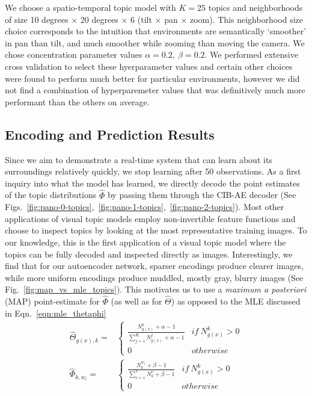 We choose a spatio-temporal topic model with $K = 25$ topics and neighborhoods of size 10 degrees $\times$ 20 degrees $\times$ 6 (tilt $\times$ pan $\times$ zoom). This neighborhood size choice corresponds to the intuition that environments are semantically `smoother' in pan than tilt, and much smoother while zooming than moving the camera. We chose concentration parameter values $\alpha = 0.2,~\beta = 0.2$. We performed extensive cross validation to select these hyerparameter values and certain other choices were found to perform much better for particular environments, however we did not find a combination of hyperparemeter values that was definitively much more performant than the others on average.

\subsection{Encoding and Prediction Results} \label{sec:spatial-prediction-results}
Since we aim to demonstrate a real-time system that can learn about its surroundings relatively quickly, we stop learning after 50 observations. As a first inquiry into what the model has learned, we directly decode the point estimates of the topic distributions $\hat{\Phi}$ by passing them through the CIB-AE decoder (See Figs.~\ref{fig:pano-0-topics},~\ref{fig:pano-1-topics},~\ref{fig:pano-2-topics}). Most other applications of visual topic models employ non-invertible feature functions and choose to inspect topics by looking at the most representative training images. To our knowledge, this is the first application of a visual topic model where the topics can be fully decoded and inspected directly as images. Interestingly, we find that for our autoencoder network, sparser encodings produce clearer images, while more uniform encodings produce muddled, mostly gray, blurry images (See Fig.~\ref{fig:map_vs_mle_topics}). This motivates us to use a \emph{maximum a posteriori} (MAP) point-estimate for $\hat{\Phi}$ (as well as for $\hat{\Theta}$) as opposed to the MLE discussed in Eqn.~\ref{eqn:mle_thetaphi}
\begin{equation} \label{eqn:map_thetaphi}
\begin{split}
\hat{\Theta}_{g(x), k} =&
    \begin{cases}
        \frac{N^k_{g(x)} + \alpha - 1}{\sum_{j=1}^K N^j_{g(x)} + \alpha - 1} & if~N^k_{g(x)} > 0 \\
        0 & otherwise
    \end{cases} \\
\hat{\Phi}_{k, w_i} =&
    \begin{cases}
        \frac{N^{w_i}_k + \beta - 1}{\sum_{v=1}^V N^v_k + \beta - 1} & if~N^k_{g(x)} > 0 \\
        0 & otherwise
    \end{cases}
\end{split}
\end{equation}


